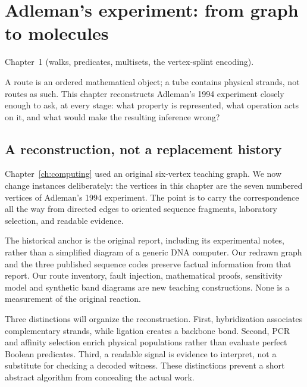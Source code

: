 \chapter{Adleman's experiment: from graph to molecules}\label{ch:adleman}
{Chapter~1 (walks, predicates, multisets, the vertex-splint encoding).}

A route is an ordered mathematical object; a tube contains physical strands,
not routes as such. This chapter reconstructs Adleman's 1994 experiment closely
enough to ask, at every stage: what property is represented, what operation acts
on it, and what would make the resulting inference wrong?

\section{A reconstruction, not a replacement history}
Chapter~\ref{ch:computing} used an original six-vertex teaching graph. We now change instances deliberately: the vertices in this chapter are the seven numbered vertices of Adleman's 1994 experiment. The point is to carry the correspondence all the way from directed edges to oriented sequence fragments, laboratory selection, and readable evidence.

The historical anchor is the original report, including its experimental notes, rather than a simplified diagram of a generic DNA computer.\cite{Adleman1994} Our redrawn graph and the three published sequence codes preserve factual information from that report. Our route inventory, fault injection, mathematical proofs, sensitivity model and synthetic band diagrams are new teaching constructions. None is a measurement of the original reaction.

Three distinctions will organize the reconstruction. First, hybridization associates complementary strands, while ligation creates a backbone bond. Second, PCR and affinity selection enrich physical populations rather than evaluate perfect Boolean predicates. Third, a readable signal is evidence to interpret, not a substitute for checking a decoded witness. These distinctions prevent a short abstract algorithm from concealing the actual work.

